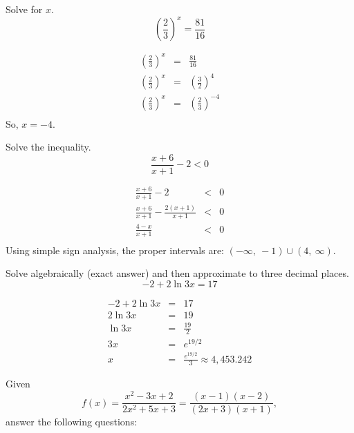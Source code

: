 \documentclass[12pt,addpoints, answers, fleqn]{exam}
\begin{document}
\begin{questions}
\begin{solution}
\end{solution}
\question Solve for $x$.
\[
\left( \frac{2}{3} \right)^x = \frac{81}{16}
\]
\begin{solution}
\begin{eqnarray*}
\left( \frac{2}{3} \right)^x &=& \frac{81}{16}\\
\left( \frac{2}{3} \right)^x &=& \left(\frac{3}{2}\right)^4\\
\left( \frac{2}{3} \right)^x &=& \left(\frac{2}{3}\right)^{-4}\\
\end{eqnarray*}
So, $\boxed{x = -4}$.
\end{solution}
\question Solve the inequality.
\[
\frac{x+6}{x+1} - 2 < 0
\]
\begin{solution}
\begin{eqnarray*}
\frac{x+6}{x+1} - 2 &<& 0\\
\frac{x+6}{x+1} - \frac{2\left(x+1\right)}{x+1} &<& 0\\
\frac{4-x}{x+1} &<& 0\\
\end{eqnarray*}
Using simple sign analysis, the proper intervals are: $\boxed{\left(-\infty, \ -1 \right) \cup \left( 4, \ \infty \right)}$.
\end{solution}
\question Solve algebraically (exact answer) and then approximate to three decimal places.
\[
-2 + 2 \ln 3x = 17
\]
\begin{solution}
\begin{eqnarray*}
-2 + 2 \ln 3x &=& 17\\
 2 \ln 3x &=& 19\\
\ln 3x &=& \frac{19}{2}\\
 3x &=& e^{19/2}\\
 x &=& \boxed{\frac{e^{19/2}}{3} \approx 4,453.242}
\end{eqnarray*}
\end{solution}
\question Given
\[
f \left( x \right) = \frac{x^2-3x+2}{2x^2+5x+3} = \frac{\left(x-1\right)\left(x-2\right)}{\left(2x+3\right)\left(x+1\right)},
\]
answer the following questions:
\end{questions}
\end{document}
